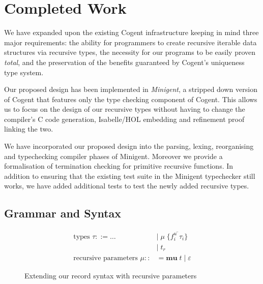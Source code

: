 \chapter{Completed Work}\label{ch:style}

We have expanded upon the existing Cogent infrastructure keeping in mind
three major requirements: the ability for programmers to create recursive iterable data structures via
recursive types, the necessity for our programs to be easily proven \textit{total},
and the preservation of the benefits guaranteed by Cogent's uniqueness type system.

Our proposed design has been implemented in \textit{Minigent}, a stripped down version of Cogent that
features only the type checking component of Cogent. This allows us to
focus on the design of our recursive types without having to change
the compiler's C code generation, Isabelle/HOL embedding and
refinement proof linking the two.

We have incorporated our proposed design into the parsing, lexing, reorganising and 
typechecking compiler phases of Minigent. Moreover we provide 
a formalisation of termination checking for primitive recursive functions.
In addition to ensuring that the existing test suite in the Minigent 
typechecker still works, we have added additional tests 
to test the newly added recursive types.

\section{Grammar and Syntax}

\begin{figure}
    \centering
    \begin{align*}
        \text{types } \tau
            ::= \dots\; &|\; \mu\; \{ \overline{f_i^u\; \tau_i} \} \\
                        &|\; t_r \\
        \text{recursive parameters }\mu ::&= \textbf{mu}\; t\; |\; \varepsilon
    \end{align*}
    \caption{Extending our record syntax with recursive parameters}
    \vspace{2em}
    \label{fig:mu}
\end{figure}

